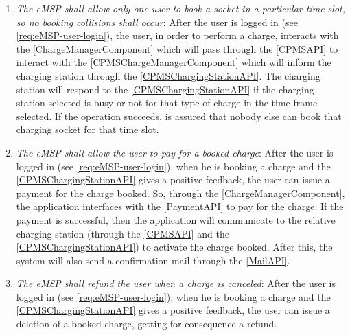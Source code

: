 \begin{enumerate}[label=\textbf{R\arabic*}]
    \label{req:eMSP-reserve-socket}
    \item \textit{The \ac{eMSP} shall allow only one user to book a socket in a particular time slot, so no booking collisions shall occur}:
    After the user is logged in (see \ref{req:eMSP-user-login}), the user, in order to perform a charge, interacts with the \ref{ChargeManagerComponent} which will pass through the \ref{CPMSAPI} to interact with the \ref{CPMSChargeManagerComponent} which will inform the charging station through the \ref{CPMSChargingStationAPI}. 
    The charging station will respond to the \ref{CPMSChargingStationAPI} if the charging station selected is busy or not for that type of charge in the time frame selected. If the operation succeeds, is assured that nobody else can book that charging socket for that time slot.
    \label{req:eMSP-no-book-collisions}
    \item \textit{The \ac{eMSP} shall allow the user to pay for a booked charge}:
    After the user is logged in (see \ref{req:eMSP-user-login}), when he is booking a charge and the \ref{CPMSChargingStationAPI} gives a positive feedback, the user can issue a payment for the charge booked. 
    So, through the \ref{ChargeManagerComponent}, the application interfaces with the \ref{PaymentAPI} to pay for the charge. If the payment is successful, then the application will communicate to the relative charging station (through the \ref{CPMSAPI} and the \ref{CPMSChargingStationAPI}) to activate the charge booked.
    After this, the system will also send a confirmation mail through the \ref{MailAPI}.
    \label{req:eMSP-payment}
    \item \textit{The \ac{eMSP} shall refund the user when a charge is canceled}:
    After the user is logged in (see \ref{req:eMSP-user-login}), when he is booking a charge and the \ref{CPMSChargingStationAPI} gives a positive feedback, the user can issue a deletion of a booked charge, getting for consequence a refund.

\end{enumerate}
